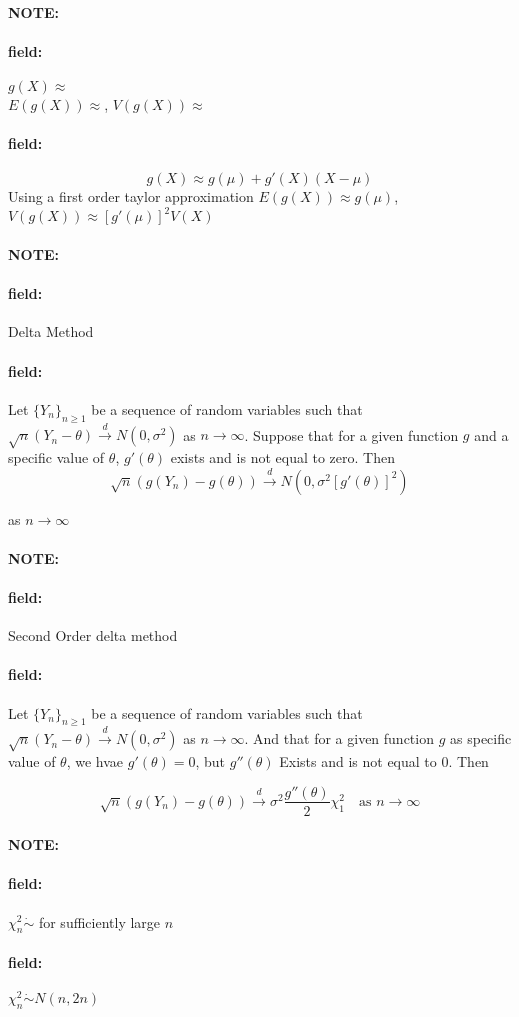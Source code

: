 \documentclass[12pt]{article}
\newenvironment{note}{\paragraph{NOTE:}}{}
\newenvironment{field}{\paragraph{field:}}{}
\begin{document}
\begin{note}
  \begin{field}
    $ g(X) \approx $ \\
$E(g(X)) \approx $, $V(g(X))\approx $
  \end{field}
  \begin{field}
    $$ g(X) \approx g(\mu) + g'(X)(X-\mu)$$ Using a first order taylor approximation
    $E(g(X)) \approx g(\mu)$, $V(g(X))\approx [g'(\mu)]^2V(X)$
  \end{field}
\end{note}

\begin{note}
  \begin{field}
    Delta Method
  \end{field}
  \begin{field}
    Let $\{Y_n\}_{n \geq 1}$ be a sequence of random variables such that $\sqrt{n}(Y_n - \theta) \overset{d}{\to} N(0,\sigma^2)$ as $n \to \infty$. Suppose that for a given function $g$ and a specific value of $\theta$, $g'(\theta)$ exists and is not equal to zero. Then
    $$\sqrt{n}(g(Y_n) - g(\theta)) \overset{d}{\to} N(0,\sigma^2[g'(\theta)]^2)$$

    as $n\to \infty$
  \end{field}
\end{note}

\begin{note}
  \begin{field}
    Second Order delta method
  \end{field}
  \begin{field}
    Let $\{Y_n\}_{n \geq 1}$ be a sequence of random variables such that $\sqrt{n}(Y_n - \theta ) \overset{d}{\to} N(0,\sigma^2)$ as $n\to \infty$.
    And that for a given function $g$ as specific value of $\theta$, we hvae $g'(\theta)=0$, but $g''(\theta)$ Exists and is not equal to 0. Then

    $$\sqrt{n}(g(Y_n) - g(\theta)) \overset{d}{\to} \sigma^2 \frac{g''(\theta)}{2}\chi^2_1 \quad \text{as } n \to \infty$$

  \end{field}
\end{note}

\begin{note}
  \begin{field}
    $\chi_n^2 \dot{\sim} $ for sufficiently large $n$
  \end{field}
  \begin{field}
    $\chi_n^2 \dot{\sim} N(n,2n)$
  \end{field}
\end{note}
\end{document}
